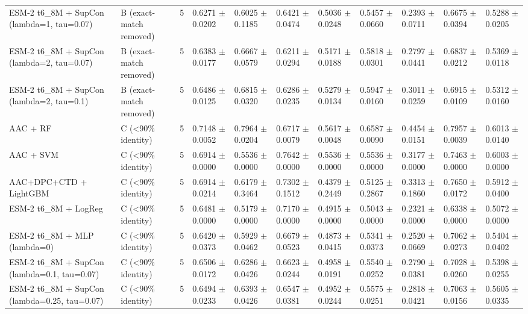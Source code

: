 \begin{table}[ht]
\begin{tabular}{lllllllllll}
ESM-2 t6\_8M + SupCon (lambda=1, tau=0.07) & B (exact-match removed) & 5 & 0.6271 $\pm$ 0.0202 & 0.6025 $\pm$ 0.1185 & 0.6421 $\pm$ 0.0474 & 0.5036 $\pm$ 0.0248 & 0.5457 $\pm$ 0.0660 & 0.2393 $\pm$ 0.0711 & 0.6675 $\pm$ 0.0394 & 0.5288 $\pm$ 0.0205 \\
ESM-2 t6\_8M + SupCon (lambda=2, tau=0.07) & B (exact-match removed) & 5 & 0.6383 $\pm$ 0.0177 & 0.6667 $\pm$ 0.0579 & 0.6211 $\pm$ 0.0294 & 0.5171 $\pm$ 0.0188 & 0.5818 $\pm$ 0.0301 & 0.2797 $\pm$ 0.0441 & 0.6837 $\pm$ 0.0212 & 0.5369 $\pm$ 0.0118 \\
ESM-2 t6\_8M + SupCon (lambda=2, tau=0.1) & B (exact-match removed) & 5 & 0.6486 $\pm$ 0.0125 & 0.6815 $\pm$ 0.0320 & 0.6286 $\pm$ 0.0235 & 0.5279 $\pm$ 0.0134 & 0.5947 $\pm$ 0.0160 & 0.3011 $\pm$ 0.0259 & 0.6915 $\pm$ 0.0109 & 0.5312 $\pm$ 0.0160 \\
AAC + RF & C (<90\% identity) & 5 & 0.7148 $\pm$ 0.0052 & 0.7964 $\pm$ 0.0204 & 0.6717 $\pm$ 0.0079 & 0.5617 $\pm$ 0.0048 & 0.6587 $\pm$ 0.0090 & 0.4454 $\pm$ 0.0151 & 0.7957 $\pm$ 0.0039 & 0.6013 $\pm$ 0.0140 \\
AAC + SVM & C (<90\% identity) & 5 & 0.6914 $\pm$ 0.0000 & 0.5536 $\pm$ 0.0000 & 0.7642 $\pm$ 0.0000 & 0.5536 $\pm$ 0.0000 & 0.5536 $\pm$ 0.0000 & 0.3177 $\pm$ 0.0000 & 0.7463 $\pm$ 0.0000 & 0.6003 $\pm$ 0.0000 \\
AAC+DPC+CTD + LightGBM & C (<90\% identity) & 5 & 0.6914 $\pm$ 0.0214 & 0.6179 $\pm$ 0.3464 & 0.7302 $\pm$ 0.1512 & 0.4379 $\pm$ 0.2449 & 0.5125 $\pm$ 0.2867 & 0.3313 $\pm$ 0.1860 & 0.7650 $\pm$ 0.0172 & 0.5912 $\pm$ 0.0400 \\
ESM-2 t6\_8M + LogReg & C (<90\% identity) & 5 & 0.6481 $\pm$ 0.0000 & 0.5179 $\pm$ 0.0000 & 0.7170 $\pm$ 0.0000 & 0.4915 $\pm$ 0.0000 & 0.5043 $\pm$ 0.0000 & 0.2321 $\pm$ 0.0000 & 0.6338 $\pm$ 0.0000 & 0.5072 $\pm$ 0.0000 \\
ESM-2 t6\_8M + MLP (lambda=0) & C (<90\% identity) & 5 & 0.6420 $\pm$ 0.0373 & 0.5929 $\pm$ 0.0462 & 0.6679 $\pm$ 0.0523 & 0.4873 $\pm$ 0.0415 & 0.5341 $\pm$ 0.0373 & 0.2520 $\pm$ 0.0669 & 0.7062 $\pm$ 0.0273 & 0.5404 $\pm$ 0.0402 \\
ESM-2 t6\_8M + SupCon (lambda=0.1, tau=0.07) & C (<90\% identity) & 5 & 0.6506 $\pm$ 0.0172 & 0.6286 $\pm$ 0.0426 & 0.6623 $\pm$ 0.0244 & 0.4958 $\pm$ 0.0191 & 0.5540 $\pm$ 0.0252 & 0.2790 $\pm$ 0.0381 & 0.7028 $\pm$ 0.0260 & 0.5398 $\pm$ 0.0255 \\
ESM-2 t6\_8M + SupCon (lambda=0.25, tau=0.07) & C (<90\% identity) & 5 & 0.6494 $\pm$ 0.0233 & 0.6393 $\pm$ 0.0426 & 0.6547 $\pm$ 0.0381 & 0.4952 $\pm$ 0.0244 & 0.5575 $\pm$ 0.0251 & 0.2818 $\pm$ 0.0421 & 0.7063 $\pm$ 0.0156 & 0.5605 $\pm$ 0.0335 \\

\end{tabular}
\end{table}
